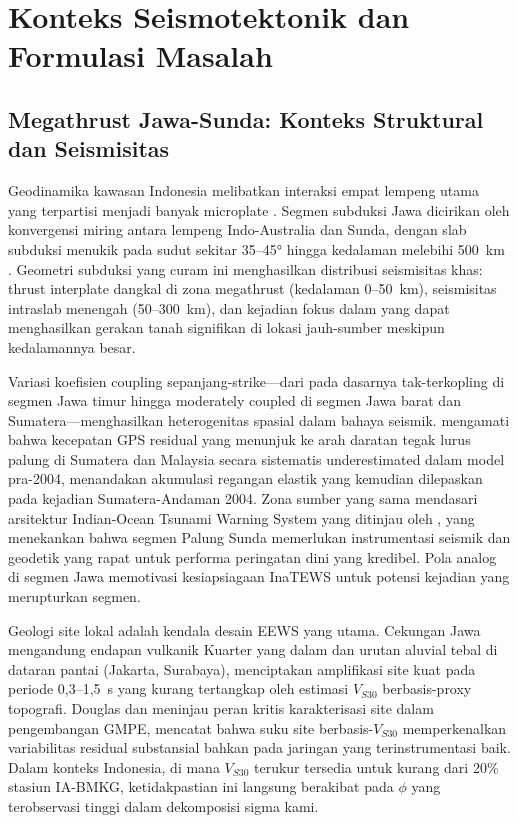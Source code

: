 \documentclass[10pt]{article}
\renewcommand{\cite}[1]{\citep{#1}}
\begin{document}
\section{Konteks Seismotektonik dan Formulasi Masalah}

\subsection{Megathrust Jawa-Sunda: Konteks Struktural dan Seismisitas}

Geodinamika kawasan Indonesia melibatkan interaksi empat lempeng utama yang terpartisi menjadi banyak microplate \cite{ref1}. Segmen subduksi Jawa dicirikan oleh konvergensi miring antara lempeng Indo-Australia dan Sunda, dengan slab subduksi menukik pada sudut sekitar 35--45° hingga kedalaman melebihi 500~km \cite{ref1}. Geometri subduksi yang curam ini menghasilkan distribusi seismisitas khas: thrust interplate dangkal di zona megathrust (kedalaman 0--50~km), seismisitas intraslab menengah (50--300~km), dan kejadian fokus dalam yang dapat menghasilkan gerakan tanah signifikan di lokasi jauh-sumber meskipun kedalamannya besar.

Variasi koefisien coupling sepanjang-strike---dari pada dasarnya tak-terkopling di segmen Jawa timur hingga moderately coupled di segmen Jawa barat dan Sumatera---menghasilkan heterogenitas spasial dalam bahaya seismik. \citet{ref2} mengamati bahwa kecepatan GPS residual yang menunjuk ke arah daratan tegak lurus palung di Sumatera dan Malaysia secara sistematis underestimated dalam model pra-2004, menandakan akumulasi regangan elastik yang kemudian dilepaskan pada kejadian Sumatera-Andaman 2004. Zona sumber yang sama mendasari arsitektur Indian-Ocean Tsunami Warning System yang ditinjau oleh \citet{jetSrivastava2008}, yang menekankan bahwa segmen Palung Sunda memerlukan instrumentasi seismik dan geodetik yang rapat untuk performa peringatan dini yang kredibel. Pola analog di segmen Jawa memotivasi kesiapsiagaan InaTEWS untuk potensi kejadian yang merupturkan segmen.

Geologi site lokal adalah kendala desain EEWS yang utama. Cekungan Jawa mengandung endapan vulkanik Kuarter yang dalam dan urutan aluvial tebal di dataran pantai (Jakarta, Surabaya), menciptakan amplifikasi site kuat pada periode 0,3--1,5~s yang kurang tertangkap oleh estimasi \(V_{S30}\) berbasis-proxy topografi. Douglas dan \citet{ref45} meninjau peran kritis karakterisasi site dalam pengembangan GMPE, mencatat bahwa suku site berbasis-\(V_{S30}\) memperkenalkan variabilitas residual substansial bahkan pada jaringan yang terinstrumentasi baik. Dalam konteks Indonesia, di mana \(V_{S30}\) terukur tersedia untuk kurang dari 20\% stasiun IA-BMKG, ketidakpastian ini langsung berakibat pada \(\phi\) yang terobservasi tinggi dalam dekomposisi sigma kami.
\end{document}
